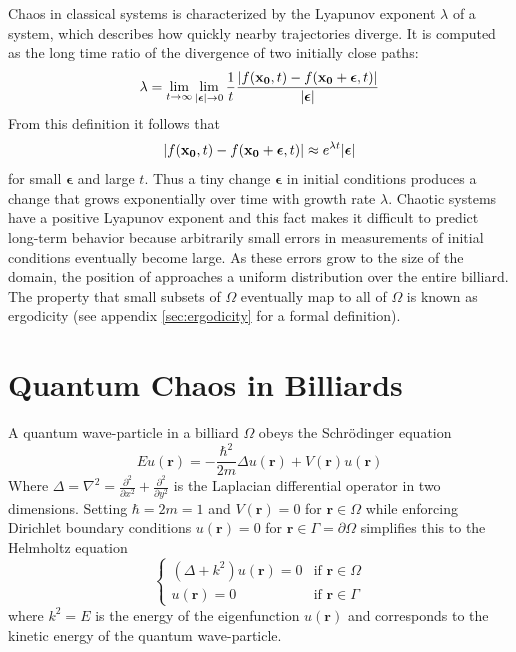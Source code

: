 \documentclass{report}
\newcommand{\rr}[0]{\mathbf{r}}
\begin{document}
Chaos in classical systems is characterized by the Lyapunov exponent $\lambda$ of a system, which describes how quickly nearby trajectories diverge. It is computed as the long time ratio of the divergence of two initially close paths:
\[
\lambda = \lim_{t \to \infty} \lim_{\vert \boldsymbol\epsilon \vert \to 0} \frac{1}{t} \frac{\vert f({\bf x_{0}}, t) - f({\bf x_{0}} + \boldsymbol\epsilon, t) \vert}{\vert \boldsymbol\epsilon \vert}
\]
From this definition it follows that
\[
\vert f({\bf x_{0}}, t) - f({\bf x_{0}} + \boldsymbol\epsilon, t) \vert \approx e^{\lambda t} \vert \boldsymbol\epsilon \vert
\]
for small $\boldsymbol\epsilon$ and large $t$. Thus a tiny change $\boldsymbol\epsilon$ in initial conditions produces a change that grows exponentially over time with growth rate $\lambda$. Chaotic systems have a positive Lyapunov exponent and this fact makes it difficult to predict long-term behavior because arbitrarily small errors in measurements of initial conditions eventually become large. As these errors grow to the size of the domain, the position of approaches a uniform distribution over the entire billiard. The property that small subsets of $\Omega$ eventually map to all of $\Omega$ is known as ergodicity (see appendix \ref{sec:ergodicity} for a formal definition).

\section{Quantum Chaos in Billiards}
\label{sec:billiards}
A quantum wave-particle in a billiard $\Omega$ obeys the Schr\"odinger equation
\[
E u(\rr) = - \frac{\hbar^{2}}{2m} \Delta u(\rr) + V(\rr) u(\rr)
\]
Where $\Delta = \nabla^{2} = \frac{\partial^{2}}{\partial x^{2}} + \frac{\partial^{2}}{\partial y^{2}}$ is the Laplacian differential operator in two dimensions. Setting $\hbar = 2m = 1$ and $V(\rr) = 0$ for $\rr \in \Omega$ while enforcing Dirichlet boundary conditions $u(\rr) = 0$ for $\rr \in \Gamma = \partial \Omega$ simplifies this to the Helmholtz equation
\begin{equation}
\label{eq:helmholtz}
\begin{cases}
(\Delta + k^{2})u(\rr) = 0 & \text{if } \rr \in \Omega\\
  u(\rr) = 0 & \text{if } \rr \in \Gamma
\end{cases}
\end{equation}
where $k^{2} = E$ is the energy of the eigenfunction $u(\rr)$ and corresponds to the kinetic energy of the quantum wave-particle.
\end{document}
